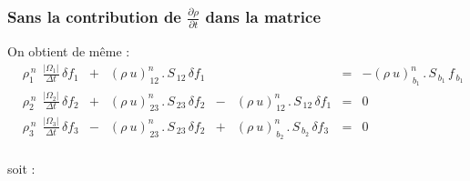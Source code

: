 \subsubsection*{Sans la contribution de
$\displaystyle\frac{\partial \rho}{\partial t}$ dans la matrice}


On obtient de m\^eme :
\begin{equation}
\begin{array}{lllllllll}
&\displaystyle \rho_1^{\,n}\ \displaystyle\ \frac{|\Omega_1|}{\Delta t}\,\delta f_1&+& (\rho\ u)^n_{\,12}\,.\,S_{\,12}\,\delta f_1& &\ \ \ \ \  &= &-(\rho\ u)^n_{\,b_1}\,.\,S_{\,b_1}\,f_{\,b_1}\\
&\displaystyle\rho_2^{\,n}\ \displaystyle\ \frac{|\Omega_2|}{\Delta
t}\,\delta f_2 &+&(\rho\ u)^n_{\,23}\,.\,S_{\,23}\,\delta f_2  &-&(\rho\
u)^n_{\,12}\,.\,S_{\,12}\,\delta f_1 &= &0\\
&\displaystyle\rho_3^{\,n}\ \displaystyle\ \frac{|\Omega_3|}{\Delta t}\,\delta
f_3 &-&(\rho\ u)^n_{\,23}\,.\,S_{\,23}\,\delta f_2     &+&(\rho\
u)^n_{\,b_2}\,.\,S_{\,b_2}\,\delta f_3 &= &0\\
\end{array}
\end{equation}

soit :


